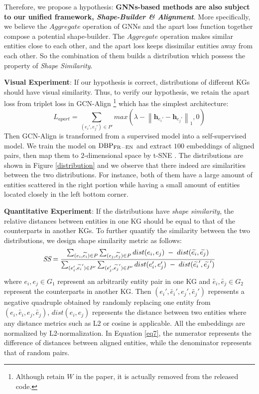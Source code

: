 \documentclass[sigconf,camera-ready]{acmart}
\begin{document}
Therefore, we propose a hypothesis: \textbf{GNNs-based methods are also subject to our unified framework, \emph{Shape-Builder \& Alignment}}.
More specifically, we believe the $Aggregate$ operation of GNNs and the apart loss function together compose a potential shape-builder.
The $Aggregate$ operation makes similar entities close to each other, and the apart loss keeps dissimilar entities away from each other.
So the combination of them builds a distribution which possess the property of \emph{Shape Similarity}.

\noindent
\textbf{Visual Experiment}:
If our hypothesis is correct, distributions of different KGs should have visual similarity.
Thus, to verify our hypothesis, we retain the apart loss from triplet loss in GCN-Align \cite{DBLP:conf/emnlp/WangLLZ18}\footnote{Although \citet{DBLP:conf/emnlp/WangLLZ18} retain $W$ in the paper, it is actually removed from the released code.} which has the simplest architecture:
\begin{equation}
  L_{apart} = \sum_{(e_i',e_j')\in P'}max\left(\lambda-{\left\|\bm{h}_{e_i{'}}-\bm{h}_{e_j{'}}\right\|}_1,0\right)
\end{equation}
Then GCN-Align is transformed from a supervised model into a self-supervised model.
We train the model on $\rm DBP_{FR-EN}$ and extract $100$ embeddings of aligned pairs, then map them to $2$-dimensional space by t-SNE \cite{Hinton2008Visualizing}.
The distributions are shown in Figure \ref{distribution} and we observe that there indeed are similarities between the two distributions.
For instance, both of them have a large amount of entities scattered in the right portion while having a small amount of entities located closely in the left bottom corner.

\noindent
\textbf{Quantitative Experiment}:
If the distributions have \emph{shape similarity}, the relative distances between entities in one KG should be equal to that of the counterparts in another KGs.
To further quantify the similarity between the two distributions, we design shape similarity metric as follows:
\begin{equation}
  {\rm \emph{SS}}=\frac{\sum_{(e_i,\widetilde{e_i})\in P}\sum_{(e_j,\widetilde{e_j})\in P}dist(e_i,e_j)\;-\;dist(\widetilde{e_i},\widetilde{e_j})}{\sum_{(e_i',\widetilde{e_i}')\in P'}\sum_{(e_j',\widetilde{e_j}')\in P'}dist(e_i',e_j')\;-\;dist(\widetilde{e_i}',\widetilde{e_j}')}
\label{eq7}
\end{equation}
where $e_i,e_j \in G_1$ represent an arbitrarily entity pair in one KG and $\widetilde{e_i},\widetilde{e_j} \in G_2$ represent the counterparts in another KG.
Then $(e_i',\widetilde{e_i}',e_j',\widetilde{e_j}')$ represents a negative quadruple obtained by randomly replacing one entity from $(e_i,\widetilde{e_i},e_j,\widetilde{e_j})$,
$dist(e_i,e_j)$ represents the distance between two entities where any distance metrics such as L$2$ or cosine is applicable.
All the embeddings are normalized by L$2$-normalization.
In Equation \ref{eq7}, the numerator represents the difference of distances between aligned entities, while the denominator represents that of random pairs.
\end{document}

